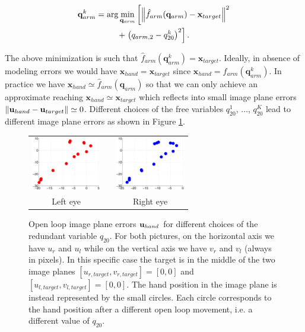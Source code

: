  \begin{multline} \label{Eq:OpenLoopMovements}
 \mathbf q_{arm}^k = \arg \min_{\mathbf q_{arm}}
  \left[
  \left\| \hat f_{arm}(\mathbf q_{arm}) - \mathbf x_{target}\right\|^2 \right. \\ + \left. \left(q_{arm,2}-q_{20}^k\right)^2
  \right].
 \end{multline}
 
 The above minimization is such that $\hat f_{arm}(\mathbf q_{arm}^k) = \mathbf x_{target}$. Ideally, in absence
 of modeling errors we would have $ \mathbf x_{hand} = \mathbf x_{target}$ since $\mathbf x_{hand} = f_{arm}(\mathbf q_{arm}^k)$. In practice we have $\mathbf x_{hand} \simeq \hat f_{arm}(\mathbf q_{arm})$ 
 so that we can only achieve an approximate reaching $ \mathbf x_{hand} \simeq \mathbf x_{target}$ 
 which reflects into small image plane errors $\| \mathbf{u}_{hand} - \mathbf{u}_{target}\| \simeq 0$. Different choices 
 of the free variables $q_{20}^1$, $\dots$, $q_{20}^K$ lead to different image plane errors as shown 
 in Figure \ref{Fig:ImagePlaneOpenLoopErrors}.



\begin{figure}
  \begin{center}
	\begin{tabular}{ccc}
	  \parbox{30mm}{\includegraphics[width=30mm]{Figure/LeftEyeOpenLoop.eps}}  & \hspace{0.1cm} &
	  \parbox{30mm}{\includegraphics[width=30mm]{Figure/RightEyeOpenLoop.eps}}
	  \\
	  \parbox{30mm}{\centering Left eye } & \hspace{0.1cm} & \parbox{30mm}{\centering Right eye }
  \end{tabular}
\end{center}
\caption{Open loop image plane errors $\mathbf{u}_{hand}$ for different
choices of the redundant variable $q_{20}$. For both pictures, on the horizontal axis 
we have $u_r$ and $u_l$ while on the vertical axis we have $v_r$ and $v_l$ (always in pixels).
In this specific case the target is in the middle of the two image planes 
$[u_{r, target}, v_{r, target}] =[0,0]$ and $[u_{l, target}, v_{l, target}]=[0,0]$.
The hand position in the image plane is instead represented 
by the small circles.  Each circle corresponds to the hand position 
after a different open loop movement, i.e. a different value of $q_{20}$.
}\label{Fig:ImagePlaneOpenLoopErrors}
  \end{figure}

